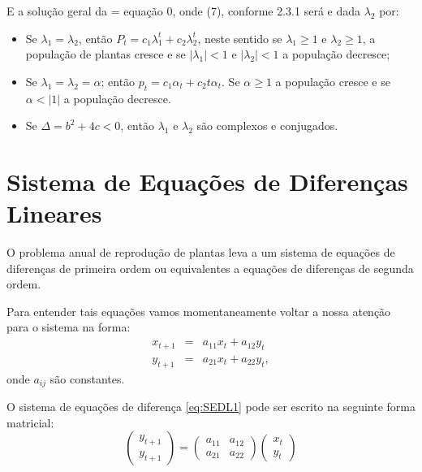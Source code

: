\begin{example}
E a solução geral da = equação 0, onde (7), conforme  2.3.1 será e dada $\lambda_{2}$ por:

\begin{itemize}
\item Se $\lambda_{1} = \lambda_{2}$, então $P_t = c_1 \lambda_{1}^{t} + c_2\lambda_{2}^{t}$, neste sentido se $\lambda_{1} \ge 1$ e $\lambda_{2} \ge 1$, a população de plantas cresce e se $|\lambda_{1}| < 1$ e $|\lambda_{2}| < 1$ a população decresce;
\item Se $\lambda_{1} = \lambda_{2} = \alpha$; então $p_t = c_1\alpha_{t} + c_2 t\alpha_{t}$. Se $\alpha \ge 1$ a população cresce e se $\alpha < |1|$ a população decresce.
\item Se $\Delta = b^2 + 4c < 0$, então $\lambda_{1}$ e $\lambda_{2}$ são complexos e conjugados. 
\end{itemize}

\end{example}


\chapter{Sistema de Equações de Diferenças Lineares}

O problema anual de reprodução de plantas leva a um sistema de equações de diferenças de primeira ordem ou equivalentes a equações de diferenças de segunda ordem. 

Para entender tais equações vamos momentaneamente voltar a nossa atenção para o sistema na forma: 
\begin{eqnarray}
\label{eq:SEDL1}
x_{t+1} &=& a_{11}x_{t} + a_{12}y_{t} \\
\label{eq:SEDL2}
y_{t+1} &=& a_{21}x_{t} + a_{22}y_{t},
\end{eqnarray}
onde $a_{ij}$ são constantes.

O sistema de equações de diferença \eqref{eq:SEDL1} pode ser escrito na seguinte forma matricial: 
\begin{equation}\label{eq:SEDL}
\left(\begin{array}{c} y_{t+1} \\ y_{t+1} \end{array}\right)
=
\left(\begin{array}{cc} a_{11} & a_{12} \\ a_{21} & a_{22} \end{array}\right)
\left(\begin{array}{c} x_{t} \\ y_{t} \end{array}\right)
\end{equation}

